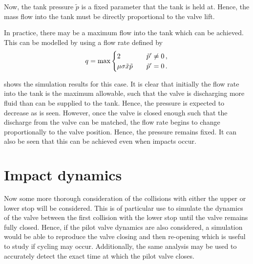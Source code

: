 Now, the tank pressure $\tilde{p}$ is a fixed parameter that the tank is held at. Hence, the mass flow into the tank must be directly proportional to the valve lift.

In practice, there may be a maximum flow into the tank which can be achieved. This can be modelled by using a flow rate defined by
~
\begin{equation*}
    q = \max \begin{cases} 2 & \quad \tilde{p}{'} \neq 0 \, , \\
    \mu \sigma \tilde{x} \tilde{p} & \quad \tilde{p}{'} = 0 \, .
    \end{cases}
\end{equation*}

 shows the simulation results for this case. It is clear that initially the flow rate into the tank is the maximum allowable, such that the valve is discharging more fluid than can be supplied to the tank.  Hence, the pressure is expected to decrease as is seen. However, once the valve is closed enough such that the discharge from the valve can be matched, the flow rate begins to change proportionally to the valve position. Hence, the pressure remains fixed. It can also be seen that this can be achieved even when impacts occur.

\section{Impact dynamics} \label{sec: ImpactDynamics}

Now some more thorough consideration of the collisions with either the upper or lower stop will be considered. This is of particular use to simulate the dynamics of the valve between the first collision with the lower stop until the valve remains fully closed. Hence, if the pilot valve dynamics are also considered, a simulation would be able to reproduce the valve closing and then re-opening which is useful to study if cycling may occur. Additionally, the same analysis may be used to accurately detect the exact time at which the pilot valve closes.

